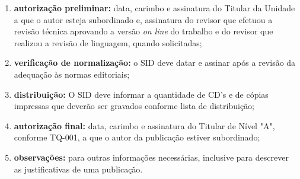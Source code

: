\begin{enumerate}
    \item \textbf{autorização preliminar:} data, carimbo e assinatura do Titular da Unidade a que o autor esteja subordinado e, assinatura do revisor que efetuou a revisão técnica aprovando a versão \emph{on line} do trabalho e do revisor que realizou a revisão de linguagem, quando solicitadas; 
    
  \item \textbf{verificação de normalização:} o SID deve datar e assinar após a revisão da adequação às normas editoriais;   
  
  \item \textbf{distribuição:} O SID deve informar a quantidade de CD's e de cópias impressas que deverão ser gravados conforme lista de distribuição;
  
 \item \textbf{autorização final:} data, carimbo e assinatura do Titular de Nível "A", conforme TQ-001, a que o autor da publicação estiver subordinado;
 
 \item \textbf{observações:} para outras informações necessárias, inclusive para descrever as justificativas de uma publicação.
\end{enumerate}